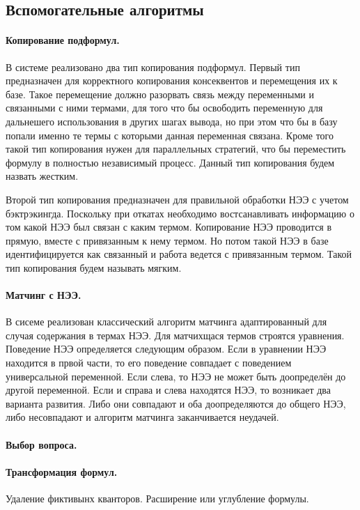 \subsection{Вспомогательные алгоритмы}

\paragraph{Копирование подформул.}
В системе реализовано два тип копирования подформул. Первый тип предназначен для корректного копирования консеквентов и перемещения их к базе. Такое перемещение должно разорвать связь между переменными и связанными с ними термами, для того что бы освободить переменную для дальнешего использования в других шагах вывода, но при этом что бы в базу попали именно те термы с которыми данная переменная связана. Кроме того такой тип копирования нужен для параллельных стратегий, что бы переместить формулу в полностью независимый процесс. Данный тип копирования будем назвать жестким.

Второй тип копирования предназначен для правильной обработки НЭЭ с учетом бэктрэкингда. Поскольку при откатах необходимо востсанавливать информацию о том какой НЭЭ был связан с каким термом. Копирование НЭЭ проводится в прямую, вместе с привязанным к нему термом. Но потом такой НЭЭ в базе идентифицируется как связанный и работа ведется с привязанным термом. Такой тип копирования будем называть мягким.


\paragraph{Матчинг с НЭЭ.} В сисеме реализован классический алгоритм матчинга адаптированный для случая содержания в термах НЭЭ. Для матчихщася термов строятся уравнения. Поведение НЭЭ определяется следующим образом. Если в уравнении НЭЭ находится в првой части, то его поведение совпадает с поведением универсальной переменной. Если слева, то НЭЭ не может быть доопределён до другой переменной. Если и справа и слева находятся НЭЭ, то возникает два варианта развития. Либо они совпадают и оба доопределяются до общего НЭЭ, либо несовпадают и алгоритм матчинга заканчивается неудачей. 

\paragraph{Выбор вопроса.}

\paragraph{Трансформация формул.} Удаление фиктивынх кванторов. Расширение или углубление формулы.

